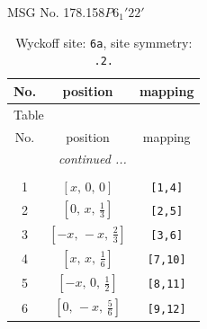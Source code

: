 \documentclass[fleqn,8pt]{jsarticle}
\begin{document}
\setcounter{MaxMatrixCols}{32}

\renewcommand{\tablename}{Table~}
\renewcommand{\figurename}{Figure~}
\begin{center}
\LARGE
MSG No. 178.158\quad$P6_{1}'22'$
\end{center}
\renewcommand{\arraystretch}{1.2}
\begin{longtable}{ccc}
\caption{Wyckoff site: {\tt 6a}, site symmetry: {\tt .2.}}
 \\
 \hline \hline
No. & position & mapping \\ \hline \endfirsthead

\multicolumn{2}{l}{\tablename\ \thetable{}} \\
 \hline \hline
No. & position & mapping \\ \hline \endhead

 \hline \hline
\multicolumn{2}{r}{\footnotesize\it continued ...} \\ \endfoot

 \hline \hline
\multicolumn{2}{r}{} \\ \endlastfoot

1 & $\left[ x,\, 0,\, 0 \right]$ & {\tt [1,4]} \\ \hline
2 & $\left[ 0,\, x,\, \frac{1}{3} \right]$ & {\tt [2,5]} \\ \hline
3 & $\left[ - x,\, - x,\, \frac{2}{3} \right]$ & {\tt [3,6]} \\ \hline
4 & $\left[ x,\, x,\, \frac{1}{6} \right]$ & {\tt [7,10]} \\ \hline
5 & $\left[ - x,\, 0,\, \frac{1}{2} \right]$ & {\tt [8,11]} \\ \hline
6 & $\left[ 0,\, - x,\, \frac{5}{6} \right]$ & {\tt [9,12]} \\
\end{longtable}
\renewcommand{\arraystretch}{1.2}
\end{document}

